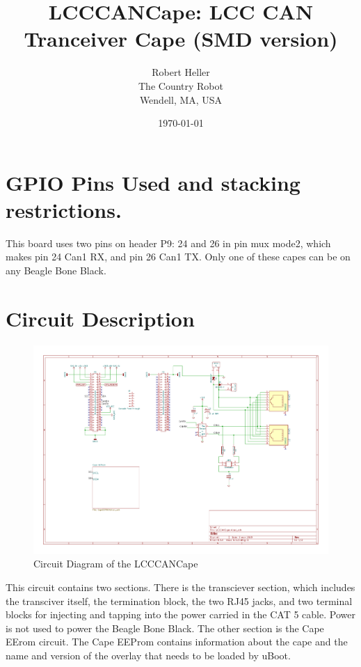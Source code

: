 \documentclass[12pt,twoside]{article}
\title{LCCCANCape: LCC CAN Tranceiver Cape (SMD version)}
\author{Robert Heller \\ The Country Robot \\ Wendell, MA, USA}
\date{\today}
\begin{document}
\maketitle

\section{GPIO Pins Used and stacking restrictions.}

This board uses two pins on header P9: 24 and 26 in pin mux mode2, which makes 
pin 24 Can1 RX, and pin 26 Can1 TX.  Only one of these capes can be on any 
Beagle Bone Black.


\section{Circuit Description}

\begin{figure}[hbpt]\begin{centering}%
\includegraphics[width=5in]{LCCCANCape.pdf}                               
\caption{Circuit Diagram of the LCCCANCape}                               
\end{centering}\end{figure}                                                    
This circuit contains two sections.  There is the transciever section, which 
includes the transciver itself, the termination block, the two RJ45 jacks, and 
two terminal blocks for injecting and tapping into the power carried in the 
CAT 5 cable.  Power is not used to power the Beagle Bone Black.  The other 
section is the Cape EErom circuit.  The Cape EEProm contains         
information about the cape and the name and version of the overlay that needs  
to be loaded by uBoot.  
\end{document}
